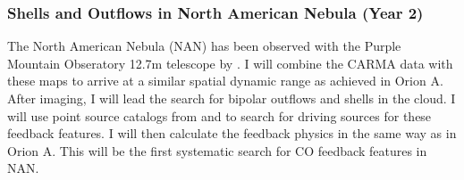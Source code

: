 \subsubsection{Shells and Outflows in North American Nebula (Year 2)}\label{sec:paper3}
        The North American Nebula (NAN) has been observed with the Purple Mountain Obseratory 12.7m telescope by \citet{Zhang14}. I will combine the CARMA data with these maps to arrive at a similar spatial dynamic range as achieved in Orion A. After imaging, I will lead the search for bipolar outflows and shells in the cloud. I will use point source catalogs from \citet{Rebull_2011} and \citet{Zhang14} to search for driving sources for these feedback features. I will then calculate the feedback physics in the same way as in Orion A. This will be the first systematic search for CO feedback features in NAN. 


    